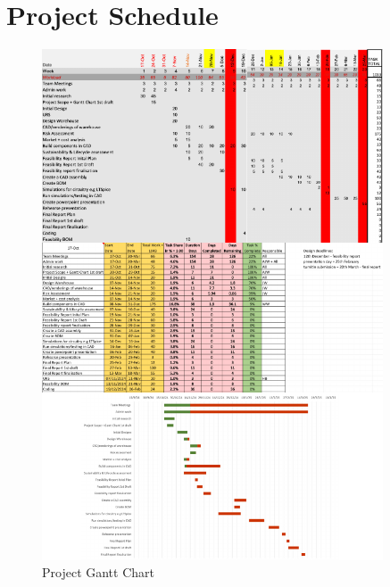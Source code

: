 \documentclass[12pt]{article}
\begin{document}
\section{Project Schedule}

\begin{figure}[h!]
    \centering
    \includegraphics[width=0.9\textwidth]{gantt chart.pdf}
    \caption{Project Gantt Chart}
    \label{fig:timeline}
\end{figure}




 \newpage
%
%
\end{document}
